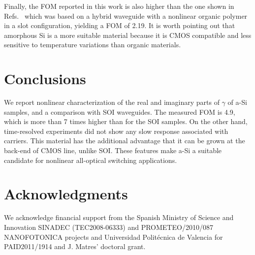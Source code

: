 \documentclass[10pt,letterpaper]{article}
\begin{document}
Finally, the FOM reported in this work is also higher than the one shown in Refs.~\cite{Vallaitis2009,Koos2009} which was based on a hybrid waveguide with a nonlinear organic polymer in a slot configuration, yielding a FOM of 2.19. It is worth pointing out that amorphous Si is a more suitable material because it is CMOS compatible and less sensitive to temperature variations than organic materials.

\section{Conclusions}
We report nonlinear characterization of the real and imaginary parts of $\gamma$ of a-Si samples, and a comparison with SOI waveguides. The measured FOM is 4.9, which is more than 7 times higher than for the SOI samples.  On the other hand, time-resolved experiments did not show any slow response associated with carriers. This material has the additional advantage that it can be grown at the back-end of CMOS line, unlike SOI. These features make a-Si a suitable candidate for nonlinear all-optical switching applications.




\section*{Acknowledgments}
We acknowledge financial support from the Spanish Ministry of Science and Innovation SINADEC (TEC2008-06333) and PROMETEO/2010/087 NANOFOTONICA projects and Universidad Polit\'ecnica de Valencia for PAID2011/1914 and J. Matres' doctoral grant.
\end{document}
